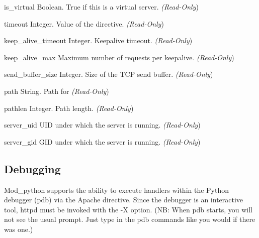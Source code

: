 \begin{memberdesc}[server]{is_virtual}
Boolean. True if this is a virtual server.
\emph{(Read-Only})
\end{memberdesc}

\begin{memberdesc}[server]{timeout}
Integer. Value of the  directive.
\emph{(Read-Only})
\end{memberdesc}

\begin{memberdesc}[server]{keep_alive_timeout}
Integer. Keepalive timeout.
\emph{(Read-Only})
\end{memberdesc}

\begin{memberdesc}[server]{keep_alive_max}
Maximum number of requests per keepalive.
\emph{(Read-Only})
\end{memberdesc}

\begin{memberdesc}[server]{send_buffer_size}
Integer. Size of the TCP send buffer.
\emph{(Read-Only})
\end{memberdesc}

\begin{memberdesc}[server]{path}
String. Path for 
\emph{(Read-Only})
\end{memberdesc}

\begin{memberdesc}[server]{pathlen}
Integer. Path length.
\emph{(Read-Only})
\end{memberdesc}

\begin{memberdesc}[server]{server_uid}
UID under which the server is running.
\emph{(Read-Only})
\end{memberdesc}

\begin{memberdesc}[server]{server_gid}
GID under which the server is running.
\emph{(Read-Only})
\end{memberdesc}

\subsection{Debugging\label{pyapi-debug}}

Mod_python supports the ability to execute handlers within the Python
debugger (pdb) via the  Apache directive. Since
the debugger is an interactive tool, httpd must be invoked with the -X
option. (NB: When pdb starts, you will not see the usual \code{>>>}
prompt. Just type in the pdb commands like you would if there was
one.)


